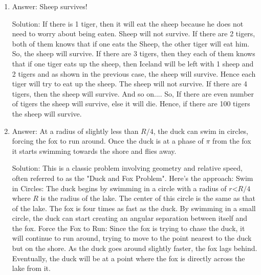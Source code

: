 \begin{enumerate}

\item
Answer: Sheep survives!
 
Solution: If there is 1 tiger, then it will eat the sheep because he does not need to worry about being eaten. Sheep will not survive.
If there are 2 tigers, both of them knows that if one eats the Sheep, the other tiger will eat him. So, the sheep will survive.
If there are 3 tigers, then they each of them knows that if one tiger eats up the sheep, then Iceland will be left with 1 sheep and 2 tigers and as shown in the previous case, the sheep will survive. Hence each tiger will try to eat up the sheep. The sheep will not survive.
If there are 4 tigers, then the sheep will survive.
And so on....
So, If there are even number of tigers the sheep will survive, else it will die. Hence, if there are 100 tigers the sheep will survive.




\item
Answer: At a radius of slightly less than $R/4$, the duck can swim in circles, forcing the fox to run around. Once the duck is at a phase of $\pi$ from the fox it starts swimming towards the shore and flies away.
 
Solution: This is a classic problem involving geometry and relative speed, often referred to as the "Duck and Fox Problem". Here's the approach:
Swim in Circles: The duck begins by swimming in a circle with a radius of $r $<$ R/4$ where $R$ is the radius of the lake. The center of this circle is the same as that of the lake. The fox is four times as fast as the duck. By swimming in a small circle, the duck can start creating an angular separation between itself and the fox.
Force the Fox to Run: Since the fox is trying to chase the duck, it will continue to run around, trying to move to the point nearest to the duck but on the shore. As the duck goes around slightly faster, the fox lags behind. Eventually, the duck will be at a point where the fox is directly across the lake from it.


\end{enumerate}
